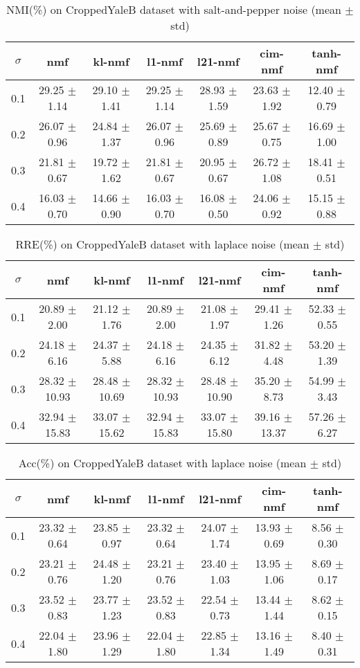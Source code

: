 \documentclass{article} %
\begin{document}
\begin{table}
\begin{tabular}{c|cccccc}$\sigma$ & nmf & kl-nmf & l1-nmf & l21-nmf & cim-nmf & tanh-nmf \\\hline
0.1 & 29.25 $\pm$ 1.14 & 29.10 $\pm$ 1.41 & 29.25 $\pm$ 1.14 & 28.93 $\pm$ 1.59 & 23.63 $\pm$ 1.92 & 12.40 $\pm$ 0.79 \\
0.2 & 26.07 $\pm$ 0.96 & 24.84 $\pm$ 1.37 & 26.07 $\pm$ 0.96 & 25.69 $\pm$ 0.89 & 25.67 $\pm$ 0.75 & 16.69 $\pm$ 1.00 \\
0.3 & 21.81 $\pm$ 0.67 & 19.72 $\pm$ 1.62 & 21.81 $\pm$ 0.67 & 20.95 $\pm$ 0.67 & 26.72 $\pm$ 1.08 & 18.41 $\pm$ 0.51 \\
0.4 & 16.03 $\pm$ 0.70 & 14.66 $\pm$ 0.90 & 16.03 $\pm$ 0.70 & 16.08 $\pm$ 0.50 & 24.06 $\pm$ 0.92 & 15.15 $\pm$ 0.88 \\
\end{tabular}\caption{
  NMI(\%) on CroppedYaleB dataset with salt-and-pepper noise (mean $\pm$ std)
  \label{tab:NMI-CroppedYaleB-salt-and-pepper}
}\end{table}
\begin{table}
\begin{tabular}{c|cccccc}$\sigma$ & nmf & kl-nmf & l1-nmf & l21-nmf & cim-nmf & tanh-nmf \\\hline
0.1 & 20.89 $\pm$ 2.00 & 21.12 $\pm$ 1.76 & 20.89 $\pm$ 2.00 & 21.08 $\pm$ 1.97 & 29.41 $\pm$ 1.26 & 52.33 $\pm$ 0.55 \\
0.2 & 24.18 $\pm$ 6.16 & 24.37 $\pm$ 5.88 & 24.18 $\pm$ 6.16 & 24.35 $\pm$ 6.12 & 31.82 $\pm$ 4.48 & 53.20 $\pm$ 1.39 \\
0.3 & 28.32 $\pm$ 10.93 & 28.48 $\pm$ 10.69 & 28.32 $\pm$ 10.93 & 28.48 $\pm$ 10.90 & 35.20 $\pm$ 8.73 & 54.99 $\pm$ 3.43 \\
0.4 & 32.94 $\pm$ 15.83 & 33.07 $\pm$ 15.62 & 32.94 $\pm$ 15.83 & 33.07 $\pm$ 15.80 & 39.16 $\pm$ 13.37 & 57.26 $\pm$ 6.27 \\
\end{tabular}\caption{
  RRE(\%) on CroppedYaleB dataset with laplace noise (mean $\pm$ std)
  \label{tab:RRE-CroppedYaleB-laplace}
}\end{table}
\begin{table}
\begin{tabular}{c|cccccc}$\sigma$ & nmf & kl-nmf & l1-nmf & l21-nmf & cim-nmf & tanh-nmf \\\hline
0.1 & 23.32 $\pm$ 0.64 & 23.85 $\pm$ 0.97 & 23.32 $\pm$ 0.64 & 24.07 $\pm$ 1.74 & 13.93 $\pm$ 0.69 & 8.56 $\pm$ 0.30 \\
0.2 & 23.21 $\pm$ 0.76 & 24.48 $\pm$ 1.20 & 23.21 $\pm$ 0.76 & 23.40 $\pm$ 1.03 & 13.95 $\pm$ 1.06 & 8.69 $\pm$ 0.17 \\
0.3 & 23.52 $\pm$ 0.83 & 23.77 $\pm$ 1.23 & 23.52 $\pm$ 0.83 & 22.54 $\pm$ 0.73 & 13.44 $\pm$ 1.44 & 8.62 $\pm$ 0.15 \\
0.4 & 22.04 $\pm$ 1.80 & 23.96 $\pm$ 1.29 & 22.04 $\pm$ 1.80 & 22.85 $\pm$ 1.34 & 13.16 $\pm$ 1.49 & 8.40 $\pm$ 0.31 \\
\end{tabular}\caption{
  Acc(\%) on CroppedYaleB dataset with laplace noise (mean $\pm$ std)
  \label{tab:Acc-CroppedYaleB-laplace}
}\end{table}
\end{document}
